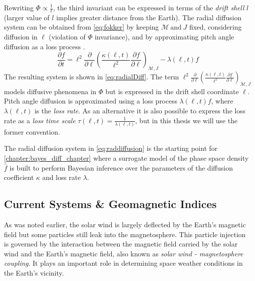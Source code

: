 Rewriting $\Phi \propto \frac{1}{\ell}$, the third invariant can be expressed in terms of the 
\emph{drift shell} $l$ (larger value of $l$ implies greater distance from the Earth). The radial 
diffusion system can be obtained from \cref{eq:fokker} by keeping $\mathcal{M}\ \text{and} \ J$ 
fixed, considering diffusion in $\ell$ (violation of $\Phi$ invariance), and by approximating pitch 
angle diffusion as a loss process \citep{Walt1970,roederer2012dynamics}.  
%
\begin{equation}\label{eq:radialDiff}
    \frac{\partial{f}}{\partial{t}} = \ell^2 \frac{\partial}{\partial{\ell}} \left( 
        \frac{\kappa(\ell, t)}{\ell^{2}} \frac{\partial{f}}{\partial{\ell}}
    \right)_{\mathcal{M}, J} - \lambda(\ell,t) f
\end{equation}
%
The resulting system is shown in \cref{eq:radialDiff}. The term 
$\ell^2 \frac{\partial}{\partial{\ell}} \left( \frac{\kappa(\ell,t)}{\ell^{2}} 
\frac{\partial{f}}{\partial{\ell}}\right)_{\mathcal{M}, J}$ models diffusive phenomena in $\Phi$ 
but is expressed in the drift shell coordinate $\ell$. Pitch angle diffusion is approximated 
using a loss process $\lambda(\ell,t) f$, where $\lambda(\ell,t)$ is the \emph{loss rate}. As an 
alternative it is also possible to express the loss rate as a \emph{loss time scale} 
$\tau(\ell,t) = \frac{1}{\lambda(\ell,t)}$, but in this thesis we will use the former convention.

The radial diffusion system in \cref{eq:raddiffusion} is the starting point for 
\cref{chapter:bayes_diff_chapter} where a surrogate model of the phase space density $\hat{f}$ is 
built to perform Bayesian inference over the parameters of the diffusion coefficient $\kappa$ and 
loss rate $\lambda$.

\subsection{Current Systems \& Geomagnetic Indices}\label{sec:geoindex}

As was noted earlier, the solar wind is largely deflected by the Earth's magnetic field but some 
particles still leak into the magnetosphere. This particle injection is governed by the interaction 
between the magnetic field carried by the solar wind and the Earth's magnetic field, also known as 
\emph{solar wind - magnetosphere coupling}. It plays an important role in determining space weather 
conditions in the Earth's vicinity. 

